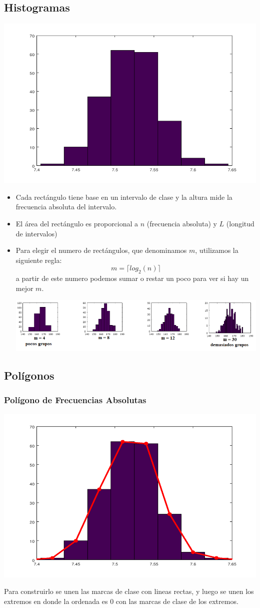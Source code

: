 \documentclass{article}
\begin{document}
\subsection{Histogramas}
    \begin{center}
        \includegraphics[width=.40\textwidth]{Images/Histogramas.png}
    \end{center}
\begin{itemize}
    \item Cada rectángulo tiene base en un intervalo de clase y la altura mide la frecuencia absoluta del intervalo.
    \item El área del rectángulo es proporcional a $n$ (frecuencia absoluta) y $L$ (longitud de intervalos)
    \item Para elegir el numero de rectángulos, que denominamos $m$, utilizamos la siguiente regla:
    \begin{equation*}
        m = \lceil log_2(n) \rceil
    \end{equation*}
    a partir de este numero podemos sumar o restar un poco para ver si hay un mejor $m$.
    \begin{center}
        \includegraphics[width=.70\textwidth]{Images/HistogramasM.png}
    \end{center}
\end{itemize}

\subsection{Polígonos}
\subsubsection{Polígono de Frecuencias Absolutas}
    \begin{center}
        \includegraphics[width=.40\textwidth]{Images/PoligonoFAbs.png}
    \end{center}
    Para construirlo se unen las marcas de clase con lineas rectas, y luego se unen los extremos en donde la ordenada es 0 con las marcas de clase de los extremos.
\end{document}

